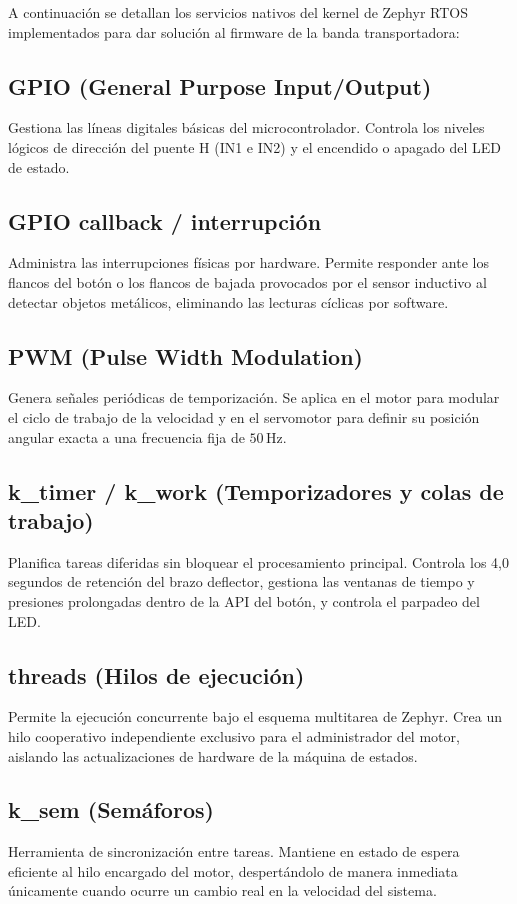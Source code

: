 \documentclass[12pt, letterpaper]{article}
\begin{document}
A continuación se detallan los servicios nativos del kernel de Zephyr RTOS implementados para dar solución al firmware de la banda transportadora:

\subsection{GPIO (General Purpose Input/Output)}
Gestiona las líneas digitales básicas del microcontrolador. Controla los niveles lógicos de dirección del puente H (IN1 e IN2) y el encendido o apagado del LED de estado.

\subsection{GPIO callback / interrupción}
Administra las interrupciones físicas por hardware. Permite responder ante los flancos del botón o los flancos de bajada provocados por el sensor inductivo al detectar objetos metálicos, eliminando las lecturas cíclicas por software.

\subsection{PWM (Pulse Width Modulation)}
Genera señales periódicas de temporización. Se aplica en el motor para modular el ciclo de trabajo de la velocidad y en el servomotor para definir su posición angular exacta a una frecuencia fija de $50\,$Hz.

\subsection{k\_timer / k\_work (Temporizadores y colas de trabajo)}
Planifica tareas diferidas sin bloquear el procesamiento principal. Controla los 4,0 segundos de retención del brazo deflector, gestiona las ventanas de tiempo y presiones prolongadas dentro de la API del botón, y controla el parpadeo del LED.

\subsection{threads (Hilos de ejecución)}
Permite la ejecución concurrente bajo el esquema multitarea de Zephyr. Crea un hilo cooperativo independiente exclusivo para el administrador del motor, aislando las actualizaciones de hardware de la máquina de estados.

\subsection{k\_sem (Semáforos)}
Herramienta de sincronización entre tareas. Mantiene en estado de espera eficiente al hilo encargado del motor, despertándolo de manera inmediata únicamente cuando ocurre un cambio real en la velocidad del sistema.
\end{document}
